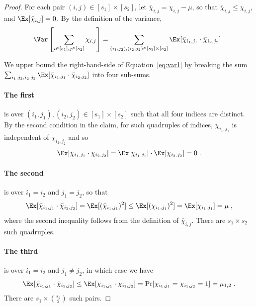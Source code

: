 \begin{proof}
For each pair $(i,j)\in [s_1]\times [s_2]$,
let $\bar{\chi}_{i,j} = \chi_{i,j} - \mu$, so that $\bar{\chi}_{i,j} \leq \chi_{i,j}$, and
$\Ex[\bar{\chi}_{i,j}] = 0$. By the definition of the variance,
\begin{equation}\label{eq:var1}
\Var\left[\sum_{i\in [s_1],j\in [s_2]}\chi_{i,j}\right] =
  \sum_{(i_1,j_2),(i_2,j_2)\in [s_1]\times[s_2]} \Ex[\bar{\chi}_{i_1,j_1}\cdot \bar{\chi}_{i_2,j_2}]\;.
\end{equation}

We upper bound the right-hand-side of Equation~\eqref{eq:var1} by breaking
 the sum $\sum_{i_1,j_2,i_2,j_2} \Ex[\bar{\chi}_{i_1,j_1}\cdot \bar{\chi}_{i_2,j_2}]$ into four sub-sums.

 \paragraph{The first} is over $(i_1,j_1), (i_2,j_2)\in [s_1]\times [s_2]$ such that all four indices are distinct. By the second condition in the claim, for such quadruples of indices, $\chi_{i_1,j_1}$ is independent of $\chi_{i_2,j_2}$ and so
\begin{equation}\label{eq:cheb-case1}
\Ex[\bar{\chi}_{i_1,j_1}\cdot \bar{\chi}_{i_2,j_2}] =  \Ex[\bar{\chi}_{i_1,j_1}]\cdot \Ex[\bar{\chi}_{i_2,j_2}] = 0\;.
\end{equation}

\paragraph{The second} is over $i_1 = i_2$ and $j_1 = j_2$, so that
\begin{equation}\label{eq:cheb-case2}
\Ex[\bar{\chi}_{i_1,j_1}\cdot \bar{\chi}_{i_2,j_2}] = \Ex[(\bar{\chi}_{i_1,j_1})^2]
\leq \Ex[(\chi_{i_1,j_1})^2] = \Ex[\chi_{i_1,j_1}] = \mu \;,
\end{equation}
where the second inequality follows from the definition of $\bar{\chi}_{i,j}$.
There are $s_1\times s_2$ such quadruples.

\paragraph{The third} is over $i_1 = i_2$ and $j_1 \neq j_2$, in which case we have
\begin{equation}\label{eq:cheb-case3}
\Ex[\bar{\chi}_{i_1,j_1}\cdot \bar{\chi}_{i_1,j_2}]
\leq \Ex[\chi_{i_1,j_1}\cdot \chi_{i_1,j_2}] = \Pr[\chi_{i_1,j_1}=\chi_{i_1,j_2}=1]
  = \mu_{1,2}\;.
\end{equation}
There are $s_1\times {s_2\choose 2}$ such pairs.


\end{proof}
